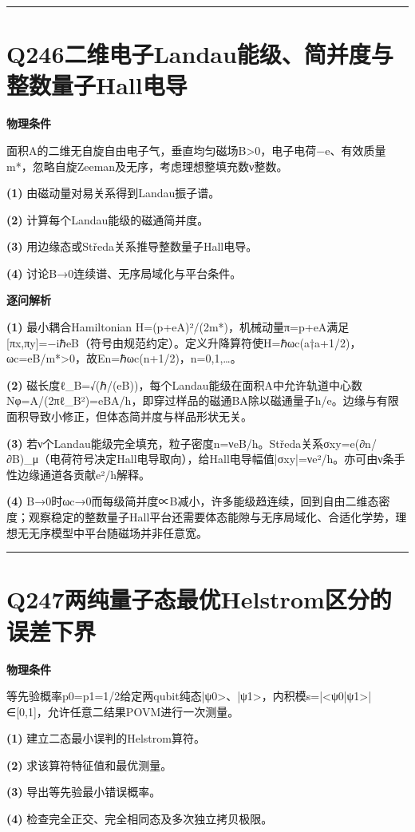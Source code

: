 \documentclass[UTF8,a4paper,11pt,oneside,openany]{ctexbook}
\begin{document}
\par\bigskip\hrule\bigskip
\section*{Q246\quad 二维电子Landau能级、简并度与整数量子Hall电导}
\textbf{物理条件}\par 面积A的二维无自旋自由电子气，垂直均匀磁场B>0，电子电荷−e、有效质量m*，忽略自旋Zeeman及无序，考虑理想整填充数ν整数。
\par\noindent\textbf{(1)} 由磁动量对易关系得到Landau振子谱。
\par\noindent\textbf{(2)} 计算每个Landau能级的磁通简并度。
\par\noindent\textbf{(3)} 用边缘态或Středa关系推导整数量子Hall电导。
\par\noindent\textbf{(4)} 讨论B→0连续谱、无序局域化与平台条件。

\par\medskip\noindent\textbf{逐问解析}
\par\noindent\textbf{(1)} 最小耦合Hamiltonian H=(p+eA)²/(2m*)，机械动量π=p+eA满足[πx,πy]=−iℏeB（符号由规范约定）。定义升降算符使H=ℏωc(a†a+1/2)，ωc=eB/m*>0，故En=ℏωc(n+1/2)，n=0,1,…。
\par\noindent\textbf{(2)} 磁长度ℓ\_B=√(ℏ/(eB))，每个Landau能级在面积A中允许轨道中心数Nφ=A/(2πℓ\_B²)=eBA/h，即穿过样品的磁通BA除以磁通量子h/e。边缘与有限面积导致小修正，但体态简并度与样品形状无关。
\par\noindent\textbf{(3)} 若ν个Landau能级完全填充，粒子密度n=νeB/h。Středa关系σxy=e(∂n/∂B)\_μ（电荷符号决定Hall电导取向），给Hall电导幅值|σxy|=νe²/h。亦可由ν条手性边缘通道各贡献e²/h解释。
\par\noindent\textbf{(4)} B→0时ωc→0而每级简并度∝B减小，许多能级趋连续，回到自由二维态密度；观察稳定的整数量子Hall平台还需要体态能隙与无序局域化、合适化学势，理想无无序模型中平台随磁场并非任意宽。

\par\bigskip\hrule\bigskip
\section*{Q247\quad 两纯量子态最优Helstrom区分的误差下界}
\textbf{物理条件}\par 等先验概率p0=p1=1/2给定两qubit纯态|ψ0>、|ψ1>，内积模s=|<ψ0|ψ1>|∈[0,1]，允许任意二结果POVM进行一次测量。
\par\noindent\textbf{(1)} 建立二态最小误判的Helstrom算符。
\par\noindent\textbf{(2)} 求该算符特征值和最优测量。
\par\noindent\textbf{(3)} 导出等先验最小错误概率。
\par\noindent\textbf{(4)} 检查完全正交、完全相同态及多次独立拷贝极限。
\end{document}
